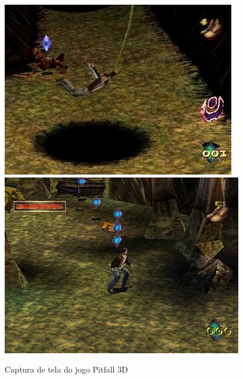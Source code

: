 \begin{itemize}
\begin{figure}[!ht]
 \centering
 \includegraphics[scale=0.62]{Imagens/pit1.png}
 \includegraphics[scale=0.6]{Imagens/pit2.png}
 \caption{Captura de tela do jogo Pitfall 3D}
 \label{img:pitfall}
\end{figure}

\end{itemize}

